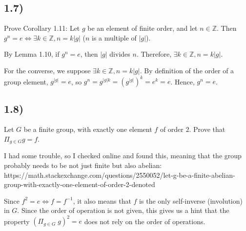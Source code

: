 \subsection*{1.7)}

Prove Corollary 1.11: Let $g$ be an element of finite order, and let $n \in \mathbb{Z}$. Then $g^n = e \Leftrightarrow \exists k \in \mathbb{Z}, n = k|g|$ ($n$ is a multiple of $|g|$).

By Lemma 1.10, if $g^n = e$, then $|g|$ divides $n$. Therefore, $\exists k \in \mathbb{Z}, n = k|g|$.

For the converse, we suppose $\exists k \in \mathbb{Z}, n = k|g|$. By definition of the order of a group element, $g^{|g|} = e$, so $g^n = g^{|g|k} = (g^{|g|})^k = e^k = e$. Hence, $g^n = e$.



\subsection*{1.8)}


Let $G$ be a finite group, with exactly one element $f$ of order $2$. Prove that $\Pi_{g \in G} g = f$.



I had some trouble, so I checked online and found this, meaning that the group probably needs to be not just finite but also abelian: https://math.stackexchange.com/questions/2550052/let-g-be-a-finite-abelian-group-with-exactly-one-element-of-order-2-denoted

Since $f^2 = e \Leftrightarrow f = f^{-1}$, it also means that $f$ is the only self-inverse (involution) in $G$. Since the order of operation is not given, this gives us a hint that the property $(\Pi_{g \in G} \; g)^2 = e$ does not rely on the order of operations.


